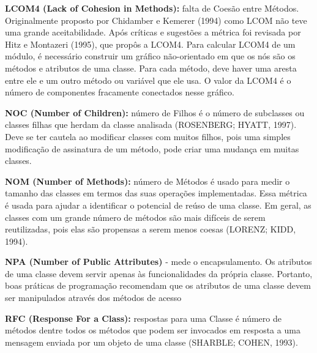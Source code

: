  \vspace{\onelineskip} 

\textbf{LCOM4 (Lack of Cohesion in Methods):} falta de Coesão entre Métodos. Originalmente
proposto por Chidamber e Kemerer (1994) como LCOM não teve uma
grande aceitabilidade. Após críticas e sugestões a métrica foi revisada por Hitz e
Montazeri (1995), que propôs a LCOM4. Para calcular LCOM4 de um módulo, é
necessário construir um gráfico não-orientado em que os nós são os métodos e atributos
de uma classe. Para cada método, deve haver uma aresta entre ele e um outro
método ou variável que ele usa. O valor da LCOM4 é o número de componentes
fracamente conectados nesse gráfico.


 \vspace{\onelineskip} 

\textbf{NOC (Number of Children):} número de Filhos é o número de subclasses ou classes
filhas que herdam da classe analisada (ROSENBERG; HYATT, 1997). Deve se ter
cautela ao modificar classes com muitos filhos, pois uma simples modificação de
assinatura de um método, pode criar uma mudança em muitas classes.


 \vspace{\onelineskip} 

\textbf{NOM (Number of Methods):} número de Métodos é usado para medir o tamanho
das classes em termos das suas operações implementadas. Essa métrica é usada para
ajudar a identificar o potencial de reúso de uma classe. Em geral, as classes com
um grande número de métodos são mais difíceis de serem reutilizadas, pois elas são
propensas a serem menos coesas (LORENZ; KIDD, 1994).


 \vspace{\onelineskip} 

\textbf{NPA (Number of Public Attributes)} - mede o encapsulamento. Os atributos de uma classe devem servir apenas às funcionalidades da própria classe. Portanto, boas práticas de programação recomendam que os atributos de uma classe devem ser manipulados através dos métodos de acesso \cite{beck1997smalltalk}



 \vspace{\onelineskip} 

\textbf{RFC (Response For a Class):} respostas para uma Classe é número de métodos
dentre todos os métodos que podem ser invocados em resposta a uma mensagem
enviada por um objeto de uma classe (SHARBLE; COHEN, 1993).



